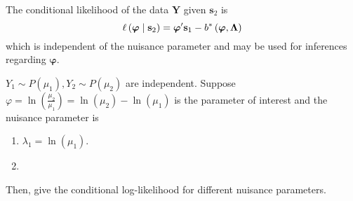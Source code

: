 The conditional likelihood of the data $\mathbf{Y}$ given $\mathbf{s}_{2}$ is
\begin{equation}
	\ell\left(\boldsymbol{\varphi}\mid\mathbf{s}_{2}\right)=\boldsymbol{\varphi}^{\prime}\mathbf{s}_{1}-b^{*}\left(\boldsymbol{\varphi},\boldsymbol{\Lambda}\right)
\end{equation}
which is independent of the nuisance parameter and may be used for inferences regarding $\boldsymbol{\varphi}$.

\begin{example}
	$Y_{1}\sim P\left(\mu_{1}\right),Y_{2}\sim P\left(\mu_{2}\right)$ are independent. Suppose $\varphi=\ln\left(\frac{\mu_{2}}{\mu_{1}}\right)=\ln\left(\mu_{2}\right)-\ln\left(\mu_{1}\right)$ is the parameter of interest and the nuisance parameter is
	\begin{enumerate}
		\item $\lambda_{1}=\ln\left(\mu_{1}\right)$.
		\item
	\end{enumerate}
	Then, give the conditional log-likelihood for different nuisance parameters.
\end{example}

